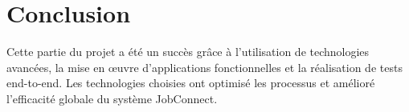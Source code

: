 








\section{Conclusion}
Cette partie du projet a été un succès grâce à l’utilisation de technologies avancées, la mise en œuvre d’applications  fonctionnelles  et  la  réalisation  de tests end-to-end. Les technologies choisies ont  optimisé  les  processus  et amélioré l’eﬀicacité globale du système JobConnect.
\newline
